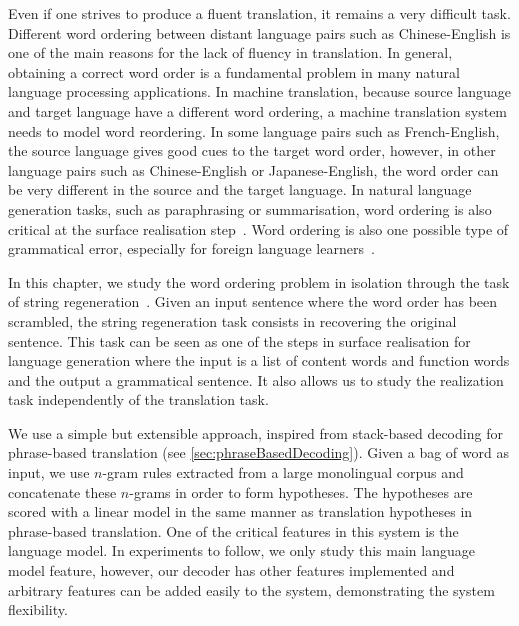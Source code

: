 Even if one strives to produce a fluent translation, it remains a very difficult task.
Different word ordering between distant language pairs such as
Chinese-English is one of the main reasons for the lack of fluency in translation.
In general, obtaining a correct word order is a fundamental problem in many natural language
processing applications.
In machine translation, because
source language and target language have a different word
ordering, a machine translation system needs to model word
reordering. In some language pairs such as French-English, the
source language gives good cues to the target word order, however,
in other language pairs such as Chinese-English or Japanese-English,
the word order can be very different in the source and
the target language. In natural language generation tasks, such
as paraphrasing or summarisation, word ordering
is also critical at the surface realisation
step~\citep{reiter-dale:1997:JNLE}.
Word ordering is also one possible type of grammatical
error, especially for foreign language
learners~\citep{yu-chen:2012:COLING}. %

In this chapter, we study the word ordering problem in
isolation through the task of
string regeneration~\citep{wan-dras-dale-paris:2009:EACL}.
Given an input sentence where the word order has
been scrambled, the string regeneration task consists in recovering
the original sentence. This task can be seen as one of the
steps in surface realisation for language generation where
the input is a list of content words and function words and
the output a grammatical sentence. It also allows us to study
the realization task independently of the translation task.

We use a simple but extensible approach, inspired from
stack-based decoding for phrase-based
translation (see \autoref{sec:phraseBasedDecoding}).
Given a bag of word as input, we use $n$-gram rules
extracted from a large monolingual corpus and concatenate
these $n$-grams in order to form hypotheses. The hypotheses are scored
with a linear model in the same manner as translation
hypotheses in phrase-based translation.
One of the critical features in this system
is the language model. In experiments to follow, we only study
this main language model feature, however, our decoder has other features
implemented and
arbitrary features can be added easily to the
system, demonstrating the system flexibility.

